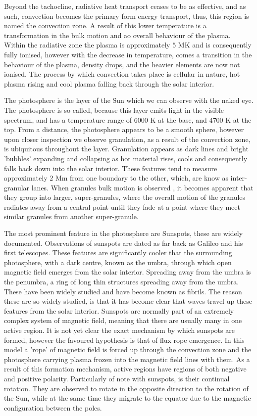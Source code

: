 Beyond the tachocline, radiative heat transport ceases to be as effective, and as such, convection becomes the primary form energy transport, thus, this region is named the convection zone. 
A result of this lower temperature is a transformation in the bulk motion and ao overall behaviour of the plasma.
Within the radiative zone the plasma is approximately $5$ MK and is consequently fully ionised, however with the decrease in temperature, comes a transition in the behaviour of the plasma, density drops, and the heavier elements are now not ionised.
The process by which convection takes place is cellular in nature, hot plasma rising and cool plasma falling back through the solar interior.
 


The photosphere is the layer of the Sun which we can observe with the naked eye.
The photosphere is so called, because this layer emits light in the visible spectrum, and has a temperature range of $6000$ K at the base, and $4700$ K at the top. 
From a distance, the photosphere appears to be a smooth sphere, however upon closer inspection we observe granulation, as a result of the convection zone, is ubiquitous throughout the layer.
Granulation appears as dark lines and bright 'bubbles' expanding and collapsing as hot material rises, cools and consequently falls back down into the solar interior.
These features tend to measure approximately $2$ Mm from one boundary to the other, which, are know as inter-granular lanes.
When granules bulk motion is observed , it becomes apparent that they group into larger, super-granules, where the overall motion of the granules radiates away from a central point until they fade at a point where they meet similar granules from another super-granule.

The most prominent feature in the photosphere are Sunspots, these are widely documented.
Observations of sunspots are dated as far back as Galileo and his first telescopes.
These features are significantly cooler that the surrounding photosphere, with a dark centre, known as the umbra, through which open magnetic field emerges from the solar interior.
Spreading away from the umbra is the penumbra, a ring of long thin structures spreading away from the umbra.
These have been widely studied and have become known as fibrils.
The reason these are so widely studied, is that it has become clear that waves travel up these features from the solar interior.
Sunspots are normally part of an extremely complex system of magnetic field, meaning that there are usually many in one active region.
It is not yet clear the exact mechanism by which sunspots are formed, however the favoured hypothesis is that of flux rope emergence.
In this model a 'rope' of magnetic field is forced up through the convection zone and the photosphere carrying plasma frozen into the magnetic field lines with them.
As a result of this formation mechanism, active regions have regions of both negative and positive polarity.
Particularly of note with sunspots, is their continual rotation.
They are observed to rotate in the opposite direction to the rotation of the Sun, while at the same time they migrate to the equator due to the magnetic configuration between the poles.


